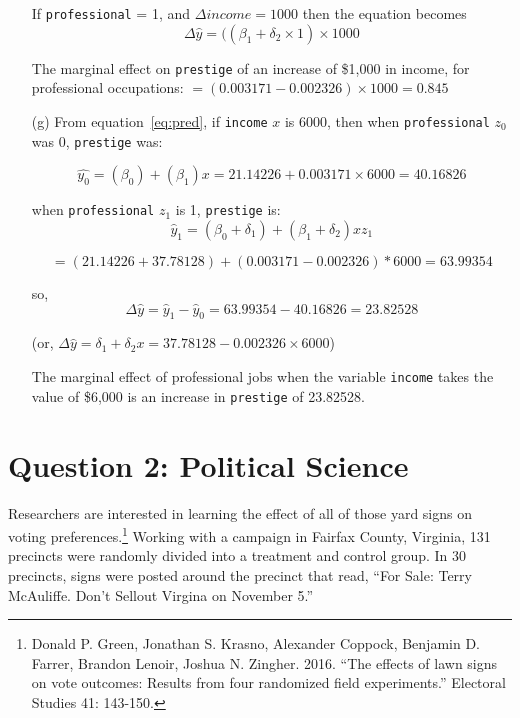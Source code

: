 \documentclass[12pt,letterpaper]{article}
\begin{document}
\begin{enumerate}
	If \texttt{professional} = 1, and $\Delta income = 1000$ then the equation becomes 
  \[\Delta\hat{y} = ((\beta_1 +\delta_2\times 1)\times  1000 \]

  The marginal effect on \texttt{prestige} of an increase of \$1,000 in income, for professional occupations:  
  $ = (0.003171-0.002326)\times 1000 = 0.845$
  
	\item [(g)]
	From equation~\ref{eq:pred}, if \texttt{income} $x$ is 6000, then when \texttt{professional} $z_0$ was 0, \texttt{prestige} was:

  \[\hat{y_0} = (\beta_0) + (\beta_1) x = 21.14226 + 0.003171\times 6000 = 40.16826\]
	
	when \texttt{professional} $z_1$ is 1, \texttt{prestige} is:
  \[\hat{y}_1  = (\beta_0 + \delta_1) + (\beta_1 +\delta_2) x z_1 \]
      
      \[= (21.14226 + 37.78128) + (0.003171-0.002326)*6000 = 63.99354  \]
	
  so, \[\Delta\hat{y} = \hat{y}_1 - \hat{y}_0 = 63.99354 - 40.16826 = 23.82528 \]

	(or, $\Delta\hat{y}  =  \delta_1 + \delta_2 x = 37.78128-0.002326\times 6000 $)
  
  The marginal effect of professional jobs when the variable \texttt{income} takes the value of \$6,000 is an increase in \texttt{prestige} of 23.82528.
  
\end{enumerate}

\newpage

\section*{Question 2: Political Science}
\noindent 	Researchers are interested in learning the effect of all of those yard signs on voting preferences.\footnote{Donald P. Green, Jonathan	S. Krasno, Alexander Coppock, Benjamin D. Farrer,	Brandon Lenoir, Joshua N. Zingher. 2016. ``The effects of lawn signs on vote outcomes: Results from four randomized field experiments.'' Electoral Studies 41: 143-150. } Working with a campaign in Fairfax County, Virginia, 131 precincts were randomly divided into a treatment and control group. In 30 precincts, signs were posted around the precinct that read, ``For Sale: Terry McAuliffe. Don't Sellout Virgina on November 5.'' \\
\end{document}
